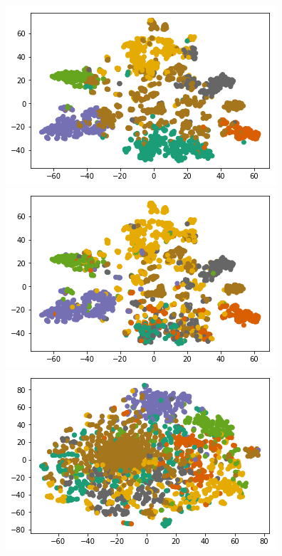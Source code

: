 \documentclass[12pt,twoside]{report}
\begin{document}
\begin{figure}[H]
\begin{center}
\begin{minipage}{0.45\linewidth}
\includegraphics[width=\linewidth]{figures/cora/our_model.png}
\end{minipage}%
\hfill
\begin{minipage}{0.45\linewidth}
\includegraphics[width=\linewidth]{figures/cora/true_our_model.png}
\end{minipage}%
\hfill
\begin{minipage}{0.45\linewidth}
\includegraphics[width=\linewidth]{figures/cora/dyngem.png}

\end{minipage}
\end{center}
\end{figure}
\end{document}
